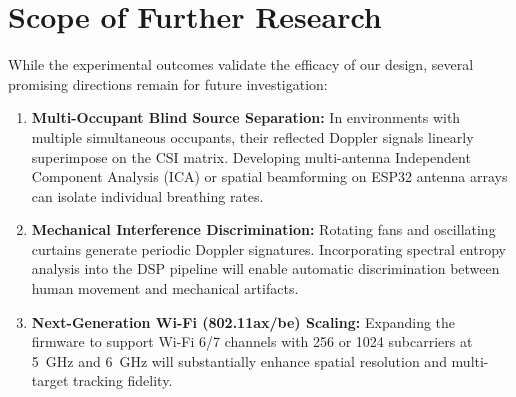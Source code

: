 \section{Scope of Further Research}
While the experimental outcomes validate the efficacy of our design, several promising directions remain for future investigation:
\begin{enumerate}
    \item \textbf{Multi-Occupant Blind Source Separation:} In environments with multiple simultaneous occupants, their reflected Doppler signals linearly superimpose on the CSI matrix. Developing multi-antenna Independent Component Analysis (ICA) or spatial beamforming on ESP32 antenna arrays can isolate individual breathing rates.
    \item \textbf{Mechanical Interference Discrimination:} Rotating fans and oscillating curtains generate periodic Doppler signatures. Incorporating spectral entropy analysis into the DSP pipeline will enable automatic discrimination between human movement and mechanical artifacts.
    \item \textbf{Next-Generation Wi-Fi (802.11ax/be) Scaling:} Expanding the firmware to support Wi-Fi 6/7 channels with 256 or 1024 subcarriers at 5~GHz and 6~GHz will substantially enhance spatial resolution and multi-target tracking fidelity.
\end{enumerate}
